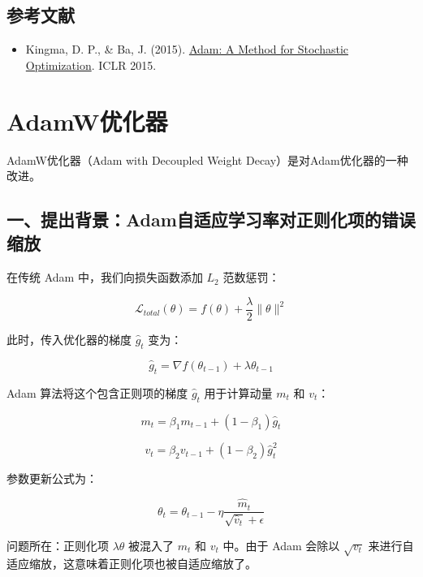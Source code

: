 \hypertarget{ux53c2ux8003ux6587ux732e-26}{%
\subsection{参考文献}\label{ux53c2ux8003ux6587ux732e-26}}

\begin{itemize}
\tightlist
\item
  Kingma, D. P., \& Ba, J. (2015). \href{https://arxiv.org/abs/1412.6980}{Adam: A Method for Stochastic Optimization}. ICLR 2015.
\end{itemize}

\clearpage

\hypertarget{adamwux4f18ux5316ux5668}{%
\section{AdamW优化器}\label{adamwux4f18ux5316ux5668}}

AdamW优化器（Adam with Decoupled Weight Decay）是对Adam优化器的一种改进。

\hypertarget{ux4e00ux63d0ux51faux80ccux666fadamux81eaux9002ux5e94ux5b66ux4e60ux7387ux5bf9ux6b63ux5219ux5316ux9879ux7684ux9519ux8befux7f29ux653e}{%
\subsection{一、提出背景：Adam自适应学习率对正则化项的错误缩放}\label{ux4e00ux63d0ux51faux80ccux666fadamux81eaux9002ux5e94ux5b66ux4e60ux7387ux5bf9ux6b63ux5219ux5316ux9879ux7684ux9519ux8befux7f29ux653e}}

在传统 Adam 中，我们向损失函数添加 \(L_2\) 范数惩罚：

\[
\mathcal{L}_{total}(\theta) = f(\theta) + \frac{\lambda}{2}\lVert\theta\rVert^2
\]

此时，传入优化器的梯度 \(\hat{g}_t\) 变为：

\[
\hat{g}_t = \nabla f(\theta_{t-1}) + \lambda\theta_{t-1}
\]

Adam 算法将这个包含正则项的梯度 \(\hat{g}_t\) 用于计算动量 \(m_t\) 和 \(v_t\)：

\[
m_t = \beta_1m_{t-1} + (1-\beta_1)\hat{g}_t
\]

\[
v_t = \beta_2v_{t-1} + (1-\beta_2)\hat{g}_t^2
\]

参数更新公式为：

\[
\theta_t = \theta_{t-1} - \eta\frac{\hat{m}_t}{\sqrt{\hat{v}_t}+\epsilon}
\]

问题所在：正则化项 \(\lambda\theta\) 被混入了 \(m_t\) 和 \(v_t\) 中。由于 Adam 会除以 \(\sqrt{v_t}\) 来进行自适应缩放，这意味着正则化项也被自适应缩放了。

